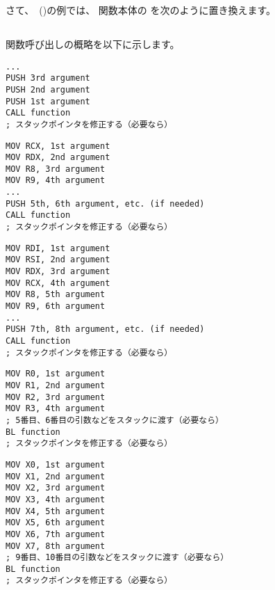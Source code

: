 \mysection{\PrintfSeveralArgumentsSectionName}

さて、\IT{\HelloWorldSectionName}~()の例では、 
\main 関数本体の \printf を次のように置き換えます。







\subsection{\Conclusion{}}

関数呼び出しの概略を以下に示します。

\begin{lstlisting}[caption=x86,style=customasmx86]
...
PUSH 3rd argument
PUSH 2nd argument
PUSH 1st argument
CALL function
; スタックポインタを修正する（必要なら）
\end{lstlisting}

\begin{lstlisting}[caption=x64 (MSVC),style=customasmx86]
MOV RCX, 1st argument
MOV RDX, 2nd argument
MOV R8, 3rd argument
MOV R9, 4th argument
...
PUSH 5th, 6th argument, etc. (if needed)
CALL function
; スタックポインタを修正する（必要なら）
\end{lstlisting}

\begin{lstlisting}[caption=x64 (GCC),style=customasmx86]
MOV RDI, 1st argument
MOV RSI, 2nd argument
MOV RDX, 3rd argument
MOV RCX, 4th argument
MOV R8, 5th argument
MOV R9, 6th argument
...
PUSH 7th, 8th argument, etc. (if needed)
CALL function
; スタックポインタを修正する（必要なら）
\end{lstlisting}

\begin{lstlisting}[caption=ARM,style=customasmARM]
MOV R0, 1st argument
MOV R1, 2nd argument
MOV R2, 3rd argument
MOV R3, 4th argument
; 5番目、6番目の引数などをスタックに渡す（必要なら）
BL function
; スタックポインタを修正する（必要なら）
\end{lstlisting}

\begin{lstlisting}[caption=ARM64,style=customasmARM]
MOV X0, 1st argument
MOV X1, 2nd argument
MOV X2, 3rd argument
MOV X3, 4th argument
MOV X4, 5th argument
MOV X5, 6th argument
MOV X6, 7th argument
MOV X7, 8th argument
; 9番目、10番目の引数などをスタックに渡す（必要なら）
BL function
; スタックポインタを修正する（必要なら）
\end{lstlisting}

